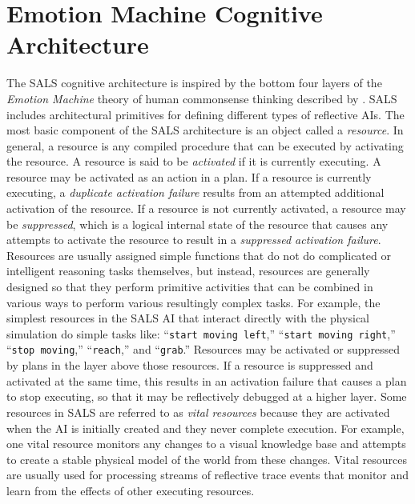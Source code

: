 \chapter{Emotion Machine Cognitive Architecture}
\label{chapter:emotion_machine_cognitive_architecture}

The SALS cognitive architecture is inspired by the bottom four layers
of the {\emph{Emotion Machine}} theory of human commonsense thinking
described by \cite{minsky:2006}.  SALS includes architectural
primitives for defining different types of reflective AIs.  The most
basic component of the SALS architecture is an object called a
{\emph{resource}}.  In general, a resource is any compiled procedure
that can be executed by activating the resource.  A resource is said
to be {\emph{activated}} if it is currently executing.  A resource may
be activated as an action in a plan.  If a resource is currently
executing, a {\emph{duplicate activation failure}} results from an
attempted additional activation of the resource.  If a resource is not
currently activated, a resource may be {\emph{suppressed}}, which is a
logical internal state of the resource that causes any attempts to
activate the resource to result in a {\emph{suppressed activation
    failure}}.  Resources are usually assigned simple functions that
do not do complicated or intelligent reasoning tasks themselves, but
instead, resources are generally designed so that they perform
primitive activities that can be combined in various ways to perform
various resultingly complex tasks.  For example, the simplest
resources in the SALS AI that interact directly with the physical
simulation do simple tasks like: ``{\tt{start moving left}},''
``{\tt{start moving right}},'' ``{\tt{stop moving}},''
``{\tt{reach}},'' and ``{\tt{grab}}.''  Resources may be activated or
suppressed by plans in the layer above those resources.  If a resource
is suppressed and activated at the same time, this results in an
activation failure that causes a plan to stop executing, so that it
may be reflectively debugged at a higher layer.  Some resources in
SALS are referred to as {\emph{vital resources}} because they are
activated when the AI is initially created and they never complete
execution.  For example, one vital resource monitors any changes to a
visual knowledge base and attempts to create a stable physical model
of the world from these changes.  Vital resources are usually used for
processing streams of reflective trace events that monitor and learn
from the effects of other executing resources.

